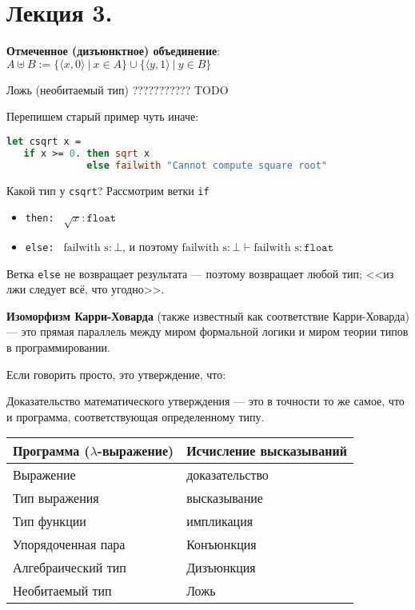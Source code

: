 \section{Лекция 3.}


 \textbf{Отмеченное (дизъюнктное) объединение}: $A \uplus B := \{ \langle x, 0 \rangle\ |\ x \in A\} \cup \{ \langle y, 1\rangle\ |\ y \in B\}$

 Ложь (необитаемый тип) ??????????? TODO

Перепишем старый пример чуть иначе:
\begin{lstlisting}[language=Caml]
let csqrt x =
   if x >= 0. then sqrt x
              else failwith "Cannot compute square root"
\end{lstlisting}

Какой тип у \verb!csqrt!? Рассмотрим ветки \verb!if!
\begin{itemize}
\item \verb!then: ! $\sqrt x : \texttt{float}$
\item \verb!else: ! $\text{failwith s} : \bot$, и поэтому $\text{failwith s} : \bot \vdash \text{failwith s} : \texttt{float}$
\end{itemize}
Ветка \verb!else! не возвращает результата --- поэтому возвращает любой тип; <<из лжи следует всё, что угодно>>.



 \textbf{Изоморфизм Карри-Ховарда} (также известный как соответствие Карри-Ховарда) — это прямая параллель между миром формальной логики и миром теории типов в программировании.

Если говорить просто, это утверждение, что:

Доказательство математического утверждения — это в точности то же самое, что и программа, соответствующая определенному типу.
\begin{center}\begin{tabular}{ll}
Программа ($\lambda$-выражение) & Исчисление высказываний\\\hline
Выражение & доказательство\\
Тип выражения & высказывание\\
Тип функции & импликация\\
Упорядоченная пара & Конъюнкция\\
Алгебраический тип & Дизъюнкция\\
Необитаемый тип & Ложь
\end{tabular}\end{center}

